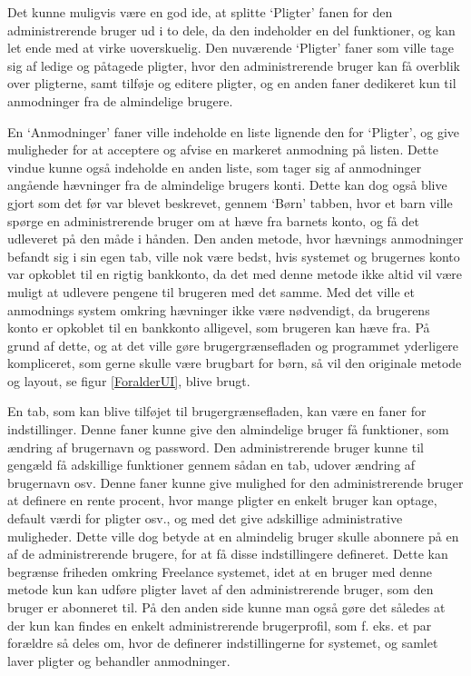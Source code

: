 Det kunne muligvis være en god ide, at splitte ‘Pligter’ fanen for den administrerende bruger ud i to dele, da den indeholder en del funktioner, og kan let ende med at virke uoverskuelig. Den nuværende ‘Pligter’ faner som ville tage sig af ledige og påtagede pligter, hvor den administrerende bruger kan få overblik over pligterne, samt tilføje og editere pligter, og en anden faner dedikeret kun til anmodninger fra de almindelige brugere.

En ‘Anmodninger’ faner ville indeholde en liste lignende den for ‘Pligter’, og give muligheder for at acceptere og afvise en markeret anmodning på listen. Dette vindue kunne også indeholde en anden liste, som tager sig af anmodninger angående hævninger fra de almindelige brugers konti. Dette kan dog også blive gjort som det før var blevet beskrevet, gennem ‘Børn’ tabben, hvor et barn ville spørge en administrerende bruger om at hæve fra barnets konto, og få det udleveret på den måde i hånden. Den anden metode, hvor hævnings anmodninger befandt sig i sin egen tab, ville nok være bedst, hvis systemet og brugernes konto var opkoblet til en rigtig bankkonto, da det med denne metode ikke altid vil være muligt at udlevere pengene til brugeren med det samme. Med det ville et anmodnings system omkring hævninger ikke være nødvendigt, da brugerens konto er opkoblet til en bankkonto alligevel, som brugeren kan hæve fra. På grund af dette, og at det ville gøre brugergrænsefladen og programmet yderligere kompliceret, som gerne skulle være brugbart for børn, så vil den originale metode og layout, se figur \ref{ForalderUI}, blive brugt.

En tab, som kan blive tilføjet til brugergrænsefladen, kan være en faner for indstillinger. Denne faner kunne give den almindelige bruger få funktioner, som ændring af brugernavn og password. Den administrerende bruger kunne til gengæld få adskillige funktioner gennem sådan en tab, udover ændring af brugernavn osv. Denne faner kunne give mulighed for den administrerende bruger at definere en rente procent, hvor mange pligter en enkelt bruger kan optage, default værdi for pligter osv., og med det give adskillige administrative muligheder. Dette ville dog betyde at en almindelig bruger skulle abonnere på en af de administrerende brugere, for at få disse indstillingere defineret. Dette kan begrænse friheden omkring Freelance systemet, idet at en bruger med denne metode kun kan udføre pligter lavet af den administrerende bruger, som den bruger er abonneret til. På den anden side kunne man også gøre det således at der kun kan findes en enkelt administrerende brugerprofil, som f. eks. et par forældre så deles om, hvor de definerer indstillingerne for systemet, og samlet laver pligter og behandler anmodninger.